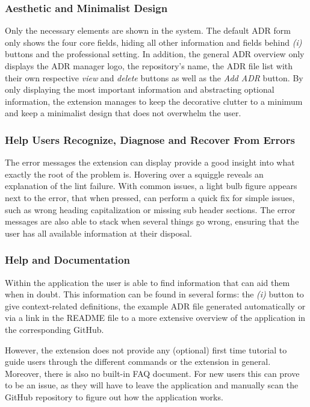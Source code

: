 \documentclass{article}
\begin{document}
\subsubsection{Aesthetic and Minimalist Design}
Only the necessary elements are shown in the system. The default ADR form only shows the four core fields, hiding all other information and fields behind \textit{(i)} buttons and the professional setting. In addition, the general ADR overview only displays the ADR manager logo, the repository's name, the ADR file list with their own respective \textit{view} and \textit{delete} buttons as well as the \textit{Add ADR} button. By only displaying the most important information and abstracting optional information, the extension manages to keep the decorative clutter to a minimum and keep a minimalist design that does not overwhelm the user.

\subsubsection{Help Users Recognize, Diagnose and Recover From Errors}
The error messages the extension can display provide a good insight into what exactly the root of the problem is. Hovering over a squiggle reveals an explanation of the lint failure. With common issues, a light bulb figure appears next to the error, that when pressed, can perform a quick fix for simple issues, such as wrong heading capitalization or missing sub header sections. The error messages are also able to stack when several things go wrong, ensuring that the user has all available information at their disposal.

\subsubsection{Help and Documentation}
Within the application the user is able to find information that can aid them when in doubt. This information can be found in several forms: the \textit{(i)} button to give context-related definitions, the example ADR file generated automatically or via a link in the README file to a more extensive overview of the application in the corresponding GitHub.

However, the extension does not provide any (optional) first time tutorial to guide users through the different commands or the extension in general. Moreover, there is also no built-in FAQ document. For new users this can prove to be an issue, as they will have to leave the application and manually scan the GitHub repository to figure out how the application works.
\end{document}
